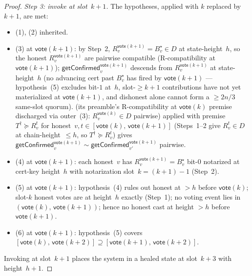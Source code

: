 \ifx\litemode\undefined\documentclass{article}\fi
\newcommand{\vote}{\mathsf{vote}}
\newcommand{\getConfirmed}{\textsf{getConfirmed}\xspace}
\theoremstyle{plain}
\theoremstyle{definition}
\theoremstyle{remark}
\begin{document}
\begin{proof}
\emph{Step 3: invoke  at slot~$k+1$.}
The hypotheses, applied with $k$ replaced by $k+1$, are met:
\begin{itemize}
  \item (1), (2) inherited.
  \item (3) at $\vote(k+1)$: by Step~2, $R_v^{\vote(k+1)} = B^\star_v \in D$ at state-height~$h$, so the honest $R_v^{\vote(k+1)}$ are pairwise compatible (R-compatibility at $\vote(k+1)$); $\getConfirmed_v^{\vote(k+1)}$ descends from $R_v^{\vote(k+1)}$ at state-height~$h$ (no advancing cert past $B^\star_v$ has fired by $\vote(k+1)$ — hypothesis~(5) excludes bit-$1$ at~$h$, slot-$\geq k+1$ contributions have not yet materialized at $\vote(k+1)$, and dishonest alone cannot form a $\geq 2n/3$ same-slot quorum).  (its preamble's R-compatibility at $\vote(k)$ premise discharged via outer~(3): $R_v^{\vote(k)} \in D$ pairwise) applied with premise $T^\dagger \succeq R_v^t$ for honest~$v, t \in [\vote(k),\, \vote(k+1)]$ (Steps~1--2 give $R_v^t \in D$ at chain-height~$\leq h$, so $T^\dagger \succeq R_v^t$) gives $\getConfirmed_v^{\vote(k+1)} \sim \getConfirmed_{v'}^{\vote(k+1)}$ pairwise.
  \item (4) at $\vote(k+1)$: each honest~$v$ has $R_v^{\vote(k+1)} = B^\star_v$ bit-$0$ notarized at cert-key height~$h$ with notarization slot~$k = (k+1)-1$ (Step~2).
  \item (5) at $\vote(k+1)$: hypothesis~(4) rules out honest at $>h$ before $\vote(k)$; slot-$k$ honest votes are at height~$h$ exactly (Step~1); no voting event lies in $(\vote(k),\, \vote(k+1))$; hence no honest cast at height $>h$ before $\vote(k+1)$.
  \item (6) at $\vote(k+1)$: hypothesis~(5) covers $[\vote(k),\, \vote(k+2)] \supseteq [\vote(k+1),\, \vote(k+2)]$.
\end{itemize}
Invoking  at slot~$k+1$ places the system in a healed state at slot~$k+3$ with height~$h+1$.
\end{proof}
\end{document}

